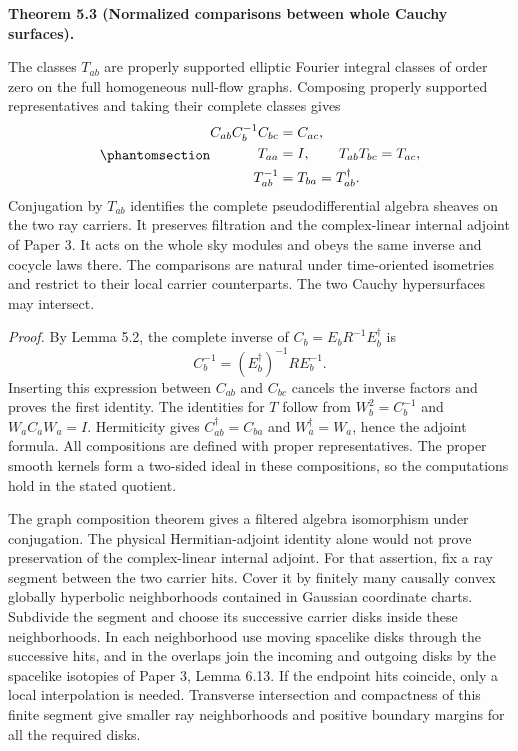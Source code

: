 \documentclass[
  english,
  11pt,
  reqno]{amsart}
\makeatletter
\newcommand{\pandocstatementheading}[1]{%
  \par\addpenalty{\@beginparpenalty}%
  \addvspace{.5\baselineskip plus .2\baselineskip minus .2\baselineskip}%
  {\normalfont\bfseries #1\par}%
  \nobreak\@afterindenttrue\@afterheading
}
\makeatother
\begin{document}
\pandocstatementheading{\protect{}\label{thm:global-carrier-cocycle}Theorem 5.3 (Normalized comparisons between whole Cauchy surfaces).}

The classes \(T_{ab}\) are properly supported elliptic Fourier integral
classes of order zero on the full homogeneous null-flow graphs.
Composing properly supported representatives and taking their complete
classes gives
\begin{equation}\protect\phantomsection\label{eq:global-carrier-cocycle}{
\begin{aligned}
C_{ab}C_b^{-1}C_{bc}&=C_{ac},\\
T_{aa}&=I,\qquad T_{ab}T_{bc}=T_{ac},\\
T_{ab}^{-1}&=T_{ba}=T_{ab}^\dagger .
\end{aligned}
}\end{equation} Conjugation by \(T_{ab}\) identifies the complete
pseudodifferential algebra sheaves on the two ray carriers. It preserves
filtration and the complex-linear internal adjoint of Paper 3. It acts
on the whole sky modules and obeys the same inverse and cocycle laws
there. The comparisons are natural under time-oriented isometries and
restrict to their local carrier counterparts. The two Cauchy
hypersurfaces may intersect.

\emph{Proof.} By Lemma 5.2, the complete inverse of
\(C_b=E_bR^{-1}E_b^\dagger\) is \[
C_b^{-1}=(E_b^\dagger)^{-1}R E_b^{-1}.
\] Inserting this expression between \(C_{ab}\) and \(C_{bc}\) cancels
the inverse factors and proves the first identity. The identities for
\(T\) follow from \(W_b^2=C_b^{-1}\) and \(W_aC_aW_a=I\). Hermiticity
gives \(C_{ab}^\dagger=C_{ba}\) and \(W_a^\dagger=W_a\), hence the
adjoint formula. All compositions are defined with proper
representatives. The proper smooth kernels form a two-sided ideal in
these compositions, so the computations hold in the stated quotient.

The graph composition theorem gives a filtered algebra isomorphism under
conjugation. The physical Hermitian-adjoint identity alone would not
prove preservation of the complex-linear internal adjoint. For that
assertion, fix a ray segment between the two carrier hits. Cover it by
finitely many causally convex globally hyperbolic neighborhoods
contained in Gaussian coordinate charts. Subdivide the segment and
choose its successive carrier disks inside these neighborhoods. In each
neighborhood use moving spacelike disks through the successive hits, and
in the overlaps join the incoming and outgoing disks by the spacelike
isotopies of Paper 3, Lemma 6.13. If the endpoint hits coincide, only a
local interpolation is needed. Transverse intersection and compactness
of this finite segment give smaller ray neighborhoods and positive
boundary margins for all the required disks.
\end{document}
